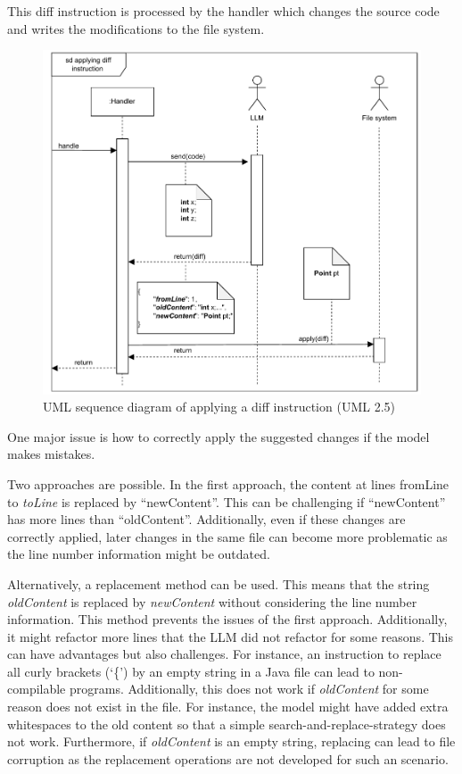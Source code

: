 This diff instruction is processed by the handler which changes the source code  and writes the modifications to the file system. 
\begin{figure}[ht!]
    \centering
    \includegraphics[width=1\columnwidth]{figures/chapter4/sequence_diagram_piece_output.drawio.pdf}
    \caption{\ac{UML} sequence diagram of applying a diff instruction (UML 2.5)}
    \label{fig:json_based_changes}
\end{figure}





One major issue is how to correctly apply the suggested changes if the model makes mistakes. 

Two approaches are possible.
In the first approach, the content at lines \textit{}{fromLine} to \textit{toLine} is replaced by \enquote{newContent}. This can be challenging if \enquote{newContent} has more lines than \enquote{oldContent}. Additionally, even if these  changes are correctly applied, later changes in the same file can become more problematic as the line number information might be outdated. 

Alternatively, a replacement method can be used. This means that the string \textit{oldContent} is replaced by \textit{newContent} without considering the line number information. This method prevents the issues of the first approach. Additionally, it might refactor more lines that the \ac{LLM} did not refactor for some reasons. This can have advantages but also challenges. For instance, an instruction to replace all curly brackets (\enquote*{\{}) by an empty string in a Java file can lead to non-compilable programs.  
Additionally, this does not work if \textit{oldContent} for some reason does not exist in the file. For instance, the model might have added extra whitespaces to the old content so that a simple search-and-replace-strategy does not work. Furthermore, if \textit{oldContent} is an empty string, replacing can lead to file corruption as the replacement operations are not developed for such an scenario. 

